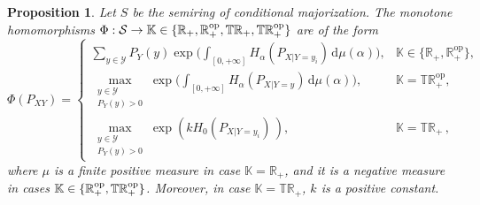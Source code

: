 \documentclass[aps,pra,11pt,onecolumn,nofootinbib,tightenlines]{revtex4-2}
\newtheorem{proposition}[theorem]{Proposition}
\theoremstyle{definition}
\newcommand{\R}{\mathbb{R}}
\newcommand{\T}{\mathbb{T}}
\newcommand{\mc}[1]{\mathcal{#1}}
\newcommand{\mb}[1]{\mathbb{#1}}
\begin{document}
\begin{proposition}
\label{prop: monotone homorphisms}
Let \( S\) be the semiring of conditional majorization. The monotone homomorphisms $\Phi:\mc S\to\mb K\in\{\R_+,\R_+^{\rm op},\T\R_+,\T\R_+^{\rm op}\}$ are of the form
\begin{equation}
\label{eq:FinalForm}
\Phi(P_{XY}) =
\begin{cases} 
\displaystyle \sum_{y \in \mathcal{Y}} P_Y(y) \exp\Bigg(\int_{[0,+\infty]} H_\alpha(P_{X|Y=y_i}) \, \mathrm{d}\mu(\alpha) \Bigg), & \mb K\in\{\mathbb{R}_+,\mathbb{R}_+^{\mathrm{op}}\}, \\
\displaystyle \max \limits_{\substack{y \in \mathcal{Y} \\ P_Y( y) > 0}} \exp\Bigg(\int_{[0,+\infty]} H_\alpha(P_{X|Y=y}) \, \mathrm{d}\mu(\alpha) \Bigg), &\mb K=\mathbb{TR}_+^{\mathrm{op}}, \\
\displaystyle \max \limits_{\substack{y \in \mathcal{Y} \\ P_Y( y) > 0}} \exp\left(k H_0(P_{X|Y=y_i}) \, \right), &\mb K=\mathbb{TR}_+ \,,
\end{cases}
\end{equation}
where $\mu$ is a finite positive measure in case $\mb K=\mathbb{R}_+$, and it is a negative measure in cases $\mb K\in\{\mathbb{R}_+^{\mathrm{op}},\T\R_+^{\rm op}\}$. Moreover, in case $\mb K=\mathbb{TR}_+$,  $k$ is a positive constant. 
\end{proposition}
\end{document}
